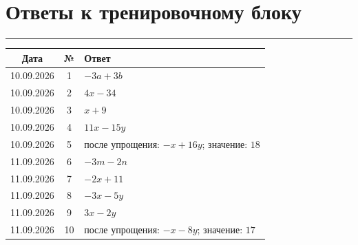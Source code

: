 \documentclass[a4paper,12pt]{article}
\newcommand{\topicline}{%
  \par
  \noindent
  \color{accent}%
  \rule{\linewidth}{0.6pt}%
  \color{black}%
  \par
}
\begin{document}

\clearpage

\section*{Ответы к тренировочному блоку}
\topicline

\begin{center}

\begin{tabularx}{\linewidth}{@{}c c X@{}}

\toprule

\textbf{Дата}
&
\textbf{№}
&
\textbf{Ответ}
\\

\midrule

10.09.2026
&
1
&
$-3a+3b$
\\

10.09.2026
&
2
&
$4x-34$
\\

10.09.2026
&
3
&
$x+9$
\\

10.09.2026
&
4
&
$11x-15y$
\\

10.09.2026
&
5
&
после упрощения:
$-x+16y$;
значение:
$18$
\\

\midrule

11.09.2026
&
6
&
$-3m-2n$
\\

11.09.2026
&
7
&
$-2x+11$
\\

11.09.2026
&
8
&
$-3x-5y$
\\

11.09.2026
&
9
&
$3x-2y$
\\

11.09.2026
&
10
&
после упрощения:
$-x-8y$;
значение:
$17$
\\

\bottomrule

\end{tabularx}

\end{center}
\end{document}
